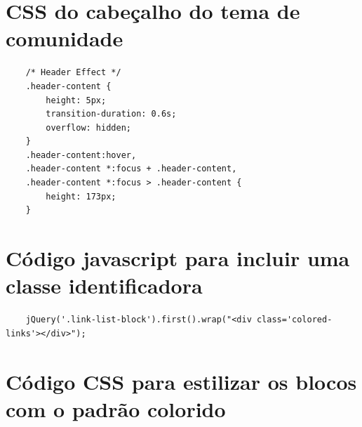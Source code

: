 \newpage
\section{CSS do cabeçalho do tema de comunidade}
\label{Att:CabecalhoComunidade}

{\tiny
  \begin{verbatim}
    /* Header Effect */
    .header-content {
        height: 5px;
        transition-duration: 0.6s;
        overflow: hidden;
    }
    .header-content:hover,
    .header-content *:focus + .header-content,
    .header-content *:focus > .header-content {
        height: 173px;
    }
  \end{verbatim}
}

\section{Código javascript para incluir uma classe identificadora}
\label{Att:CodigoJsLinkColoridos}

{\tiny
  \begin{verbatim}
    jQuery('.link-list-block').first().wrap("<div class='colored-links'></div>");
  \end{verbatim}
}

\section{Código CSS para estilizar os blocos com o padrão colorido}
\label{Att:CodigoCSSLinkColoridos}

